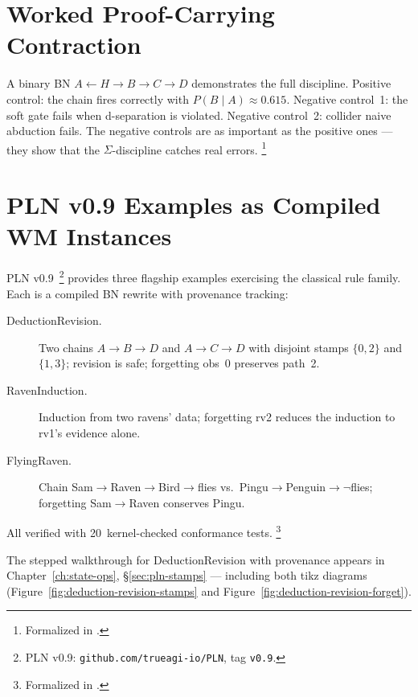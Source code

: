 \documentclass[11pt,openany]{report}
\begin{document}
\section{Worked Proof-Carrying Contraction}

A binary BN $A \leftarrow H \to B \to C \to D$ demonstrates the full
discipline.  Positive control: the chain fires correctly with
$P(B \mid A) \approx 0.615$.  Negative control~1: the soft gate
fails when d-separation is violated.  Negative control~2: collider
naive abduction fails.  The negative controls are as important as
the positive ones --- they show that the $\Sigma$-discipline catches
real errors.%
\footnote{Formalized in
.}


\section{PLN v0.9 Examples as Compiled WM Instances}

PLN v0.9~\cite{goertzel2009pln}\footnote{PLN v0.9:
\texttt{github.com/trueagi-io/PLN}, tag \texttt{v0.9}.} provides
three flagship examples exercising the classical rule family.  Each
is a compiled BN rewrite with provenance tracking:

\begin{description}
\item[DeductionRevision.]  Two chains $A \to B \to D$ and
  $A \to C \to D$ with disjoint stamps $\{0,2\}$ and $\{1,3\}$;
  revision is safe; forgetting obs~0 preserves path~2.

\item[RavenInduction.]  Induction from two ravens' data; forgetting
  rv2 reduces the induction to rv1's evidence alone.

\item[FlyingRaven.]  Chain Sam$\to$Raven$\to$Bird$\to$flies vs.\
  Pingu$\to$Penguin$\to\neg$flies; forgetting Sam$\to$Raven
  conserves Pingu.
\end{description}

\noindent
All verified with 20~kernel-checked conformance tests.%
\footnote{Formalized in
.}

The stepped walkthrough for DeductionRevision with provenance
appears in Chapter~\ref{ch:state-ops},
\S\ref{sec:pln-stamps} --- including both tikz diagrams
(Figure~\ref{fig:deduction-revision-stamps} and
Figure~\ref{fig:deduction-revision-forget}).
\end{document}
